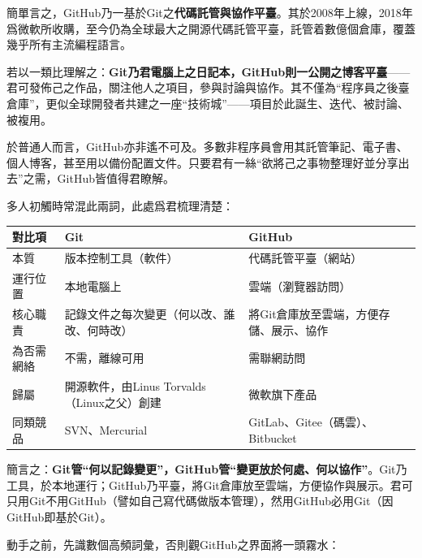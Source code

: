 


簡單言之，GitHub乃一基於Git之\textbf{代碼託管與協作平臺}。其於2008年上線，2018年爲微軟所收購，至今仍為全球最大之開源代碼託管平臺，託管着數億個倉庫，覆蓋幾乎所有主流編程語言。

若以一類比理解之：\textbf{Git乃君電腦上之日記本，GitHub則一公開之博客平臺}——君可發佈己之作品，關注他人之項目，參與討論與協作。其不僅為“程序員之後臺倉庫”，更似全球開發者共建之一座“技術城”——項目於此誕生、迭代、被討論、被複用。

於普通人而言，GitHub亦非遙不可及。多數非程序員會用其託管筆記、電子書、個人博客，甚至用以備份配置文件。只要君有一絲“欲將己之事物整理好並分享出去”之需，GitHub皆值得君瞭解。


多人初觸時常混此兩詞，此處爲君梳理清楚：

\begin{center}
\begin{tabularx}{\linewidth}{|X|X|X|}
\hline
\textbf{對比項} & \textbf{Git} & \textbf{GitHub} \tabularnewline
\hline
本質 & 版本控制工具（軟件） & 代碼託管平臺（網站） \tabularnewline
運行位置 & 本地電腦上 & 雲端（瀏覽器訪問） \tabularnewline
核心職責 & 記錄文件之每次變更（何以改、誰改、何時改） & 將Git倉庫放至雲端，方便存儲、展示、協作 \tabularnewline
為否需網絡 & 不需，離線可用 & 需聯網訪問 \tabularnewline
歸屬 & 開源軟件，由Linus Torvalds（Linux之父）創建 & 微軟旗下產品 \tabularnewline
同類競品 & SVN、Mercurial & GitLab、Gitee（碼雲）、Bitbucket \tabularnewline
\hline
\end{tabularx}
\end{center}

簡言之：\textbf{Git管“何以記錄變更”，GitHub管“變更放於何處、何以協作”}。Git乃工具，於本地運行；GitHub乃平臺，將Git倉庫放至雲端，方便協作與展示。君可只用Git不用GitHub（譬如自己寫代碼做版本管理），然用GitHub必用Git（因GitHub即基於Git）。



動手之前，先識數個高頻詞彙，否則觀GitHub之界面將一頭霧水：

